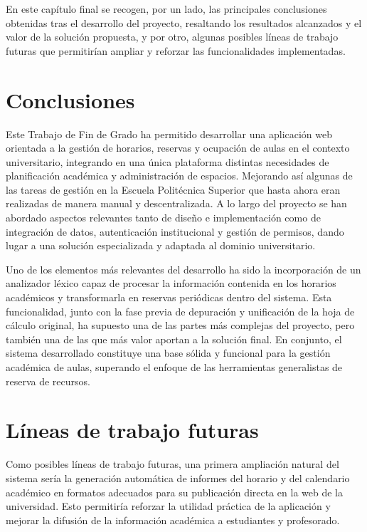 
En este capítulo final se recogen, por un lado, las principales conclusiones obtenidas tras el desarrollo del proyecto, resaltando los resultados alcanzados y el valor de la solución propuesta, y por otro, algunas posibles líneas de trabajo futuras que permitirían ampliar y reforzar las funcionalidades implementadas.

\section{Conclusiones}

Este Trabajo de Fin de Grado ha permitido desarrollar una aplicación web orientada a la gestión de horarios, reservas y ocupación de aulas en el contexto universitario, integrando en una única plataforma distintas necesidades de planificación académica y administración de espacios. Mejorando así algunas de las tareas de gestión en la Escuela Politécnica Superior que hasta ahora eran realizadas de manera manual y descentralizada. A lo largo del proyecto se han abordado aspectos relevantes tanto de diseño e implementación como de integración de datos, autenticación institucional y gestión de permisos, dando lugar a una solución especializada y adaptada al dominio universitario.

Uno de los elementos más relevantes del desarrollo ha sido la incorporación de un analizador léxico capaz de procesar la información contenida en los horarios académicos y transformarla en reservas periódicas dentro del sistema. Esta funcionalidad, junto con la fase previa de depuración y unificación de la hoja de cálculo original, ha supuesto una de las partes más complejas del proyecto, pero también una de las que más valor aportan a la solución final. En conjunto, el sistema desarrollado constituye una base sólida y funcional para la gestión académica de aulas, superando el enfoque de las herramientas generalistas de reserva de recursos.

\section{Líneas de trabajo futuras}

Como posibles líneas de trabajo futuras, una primera ampliación natural del sistema sería la generación automática de informes del horario y del calendario académico en formatos adecuados para su publicación directa en la web de la universidad. Esto permitiría reforzar la utilidad práctica de la aplicación y mejorar la difusión de la información académica a estudiantes y profesorado.

